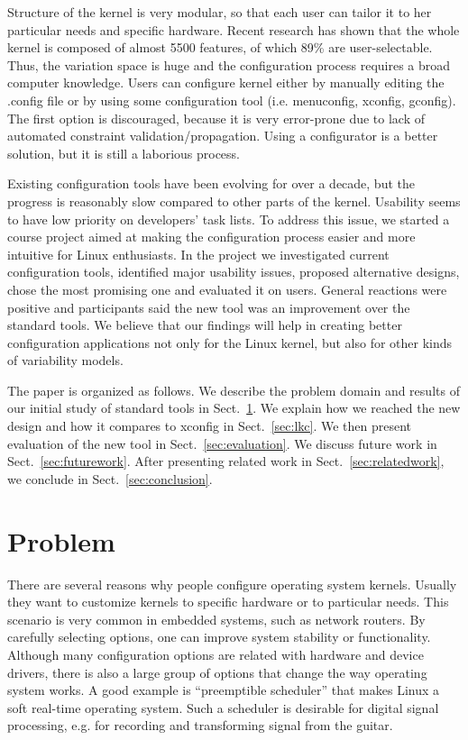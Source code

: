 \documentclass{chi2009}
\newcommand{\secref}[1]{Sect.~\ref{sec:#1}}
\begin{document}
Structure of the kernel is very modular, so that each user can tailor it to her particular needs and specific hardware. Recent research \cite{she:kernel:2010} has shown that the whole kernel is composed of almost 5500 features, of which 89\% are user-selectable. Thus, the variation space is huge and the configuration process requires a broad computer knowledge. Users can configure kernel either by manually editing the \textsf{.config} file or by using some configuration tool (i.e. \textsf{menuconfig, xconfig, gconfig}). The first option is discouraged, because it is very error-prone due to lack of automated constraint validation/propagation. Using a configurator is a better solution, but it is still a laborious process.

Existing configuration tools have been evolving for over a decade, but the progress is reasonably slow compared to other parts of the kernel. Usability seems to have low priority on developers' task lists. To address this issue, we started a course project aimed at making the configuration process easier and more intuitive for Linux enthusiasts. In the project we investigated current configuration tools, identified major usability issues, proposed alternative designs, chose the most promising one and evaluated it on users. General reactions were positive and participants said the new tool was an improvement over the standard tools. We believe that our findings will help in creating better configuration applications not only for the Linux kernel, but also for other kinds of variability models.

The paper is organized as follows. We describe the problem domain and results of our initial study of standard tools in \secref{problem}. We explain how we reached the new design and how it compares to \textsf{xconfig} in \secref{lkc}. We then present evaluation of the new tool in \secref{evaluation}. We discuss future work in \secref{futurework}. After presenting related work in \secref{relatedwork}, we conclude in \secref{conclusion}.

\section{Problem}\label{sec:problem}

There are several reasons why people configure operating system kernels. Usually they want to customize kernels to specific hardware or to particular needs. This scenario is very common in embedded systems, such as network routers. By carefully selecting options, one can improve system stability or functionality. Although many configuration options are related with hardware and device drivers, there is also a large group of options that change the way operating system works. A good example is ``preemptible scheduler'' that makes Linux a soft real-time operating system. Such a scheduler is desirable for digital signal processing, e.g. for recording and transforming signal from the guitar.
\end{document}
